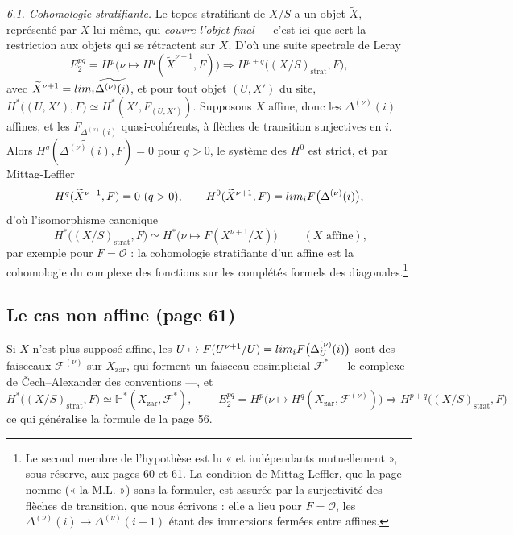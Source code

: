 \documentclass[11pt,a4paper]{article}
\begin{document}
\emph{6.1. Cohomologie stratifiante.} Le topos stratifiant de $X/S$ a un
objet $\widetilde{X}$, représenté par $X$ lui-même, qui \emph{couvre l'objet
final} — c'est ici que sert la restriction aux objets qui se rétractent sur
$X$. D'où une suite spectrale de Leray
\[
  E_{2}^{pq} = H^{p}\bigl(\nu \mapsto H^{q}(\widetilde{X}^{\nu+1}, F)\bigr)
  \Longrightarrow H^{p+q}\bigl((X/S)_{\mathrm{strat}}, F\bigr) ,
\]
avec $\widetilde{X}^{\nu+1} = \varinjlim_{i} \widetilde{\Delta^{(\nu)}(i)}$, et
pour tout objet $(U, X')$ du site, $H^{*}\bigl((U, X'), F\bigr) \simeq
H^{*}(X', F_{(U, X')})$. Supposons $X$ affine, donc les $\Delta^{(\nu)}(i)$
affines, et les $F_{\Delta^{(\nu)}(i)}$ quasi-cohérents, à flèches de
transition surjectives en $i$. Alors $H^{q}(\widetilde{\Delta^{(\nu)}(i)}, F) =
0$ pour $q > 0$, le système des $H^{0}$ est strict, et par Mittag-Leffler
\[
  H^{q}(\widetilde{X}^{\nu+1}, F) = 0 \ (q > 0) ,
  \qquad
  H^{0}(\widetilde{X}^{\nu+1}, F) = \varprojlim_{i} F\bigl(\Delta^{(\nu)}(i)\bigr) ,
\]
d'où l'isomorphisme canonique
\[
  \boxed{\;H^{*}\bigl((X/S)_{\mathrm{strat}}, F\bigr) \simeq
  H^{*}\bigl(\nu \mapsto F(X^{\nu+1}/X)\bigr)\;}
  \qquad (X \text{ affine}) ,
\]
par exemple pour $F = \mathcal{O}$ : la cohomologie stratifiante d'un affine
est la cohomologie du complexe des fonctions sur les complétés formels des
diagonales.\footnote{Le second membre de l'hypothèse est lu « et
indépendants mutuellement », sous réserve, aux pages 60 et 61. La condition
de Mittag-Leffler, que la page nomme (« la M.L. ») sans la formuler, est
assurée par la surjectivité des flèches de transition, que nous
écrivons : elle a lieu pour $F = \mathcal{O}$, les $\Delta^{(\nu)}(i) \to
\Delta^{(\nu)}(i+1)$ étant des immersions fermées entre affines.}

\subsection*{Le cas non affine (page 61)}

Si $X$ n'est plus supposé affine, les
$U \mapsto F(U^{\nu+1}/U) = \varprojlim_{i} F\bigl(\Delta^{(\nu)}_{U}(i)\bigr)$
sont des faisceaux $\mathcal{F}^{(\nu)}$ sur $X_{\mathrm{zar}}$, qui forment un
faisceau cosimplicial $\mathcal{F}^{*}$ — le complexe de Čech--Alexander des
conventions —, et
\[
  H^{*}\bigl((X/S)_{\mathrm{strat}}, F\bigr) \simeq
  \mathbb{H}^{*}(X_{\mathrm{zar}}, \mathcal{F}^{*}) ,
  \qquad
  \boxed{\;E_{2}^{pq} = H^{p}\bigl(\nu \mapsto H^{q}(X_{\mathrm{zar}},
  \mathcal{F}^{(\nu)})\bigr) \Longrightarrow
  H^{p+q}\bigl((X/S)_{\mathrm{strat}}, F\bigr)\;}
\]
ce qui généralise la formule de la page 56.
\end{document}
